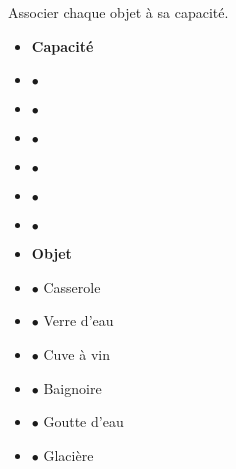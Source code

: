 \begin{exercice*}
   Associer chaque objet à sa capacité.

   \begin{minipage}{0.35\linewidth}      
         \begin{itemize}
            \item[] {\bfseries Capacité}
            \item[]   \hfill $\bullet$
            \item[]  \hfill $\bullet$
            \item[]  \hfill $\bullet$
            \item[]  \hfill $\bullet$
            \item[]  \hfill $\bullet$
            \item[]  \hfill $\bullet$
         \end{itemize}      
   \end{minipage}
   \hfill
   \begin{minipage}{0.5\linewidth}
      \begin{itemize}
         \item[] \phantom{$\bullet$} {\bfseries Objet}
         \item[] $\bullet$ Casserole
         \item[] $\bullet$ Verre d'eau
         \item[] $\bullet$ Cuve à vin
         \item[] $\bullet$ Baignoire
         \item[] $\bullet$ Goutte d'eau
         \item[] $\bullet$ Glacière
      \end{itemize}      
   \end{minipage}
\end{exercice*}